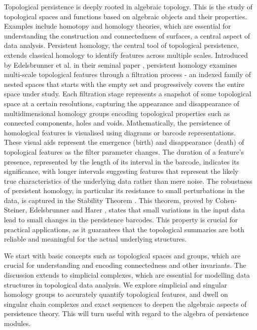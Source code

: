 \label{TopologicalSpaces}
Topological persistence is deeply rooted in algebraic topology. This is the study of topological spaces and functions based on algebraic objects and their properties. Examples include homotopy and homology theories, which are essential for understanding the construction and connectedness of surfaces, a central aspect of data analysis. Persistent homology, the central tool of topological persistence, extends classical homology to identify features across multiple scales. Introduced by Edelsbrunner et al. in their seminal paper \cite{edelsbrunner2000triangulations}, persistent homology examines multi-scale topological features through a filtration process - an indexed family of nested spaces that starts with the empty set and progressively covers the entire space under study. Each filtration stage represents a snapshot of some topological space at a certain resolutions, capturing the appearance and disappearance of multidimensional homology groups encoding topological properties such as connected components, holes and voids. Mathematically, the persistence of homological features is visualised using diagrams or barcode representations.  These visual aids represent the emergence (birth) and disappearance (death) of topological features as the filter parameter changes. The duration of a feature's presence, represented by the length of its interval in the barcode, indicates its significance, with longer intervals suggesting features that represent the likely true characteristics of the underlying data rather than mere noise. The robustness of persistent homology, in particular its resistance to small perturbations in the data, is captured in the Stability Theorem \cite[\S 3.1]{Cohen-Steiner2007}. This theorem, proved by Cohen-Steiner, Edelsbrunner and Harer \cite[\S 3]{bendich2007inferring}, states that small variations in the input data lead to small changes in the persistence barcodes. This property is crucial for practical applications, as it guarantees that the topological summaries are both reliable and meaningful for the actual underlying structures.

We start with basic concepts such as topological spaces and groups, which are crucial for understanding and encoding connectedness and other invariants. The discussion extends to simplicial complexes, which are essential for modelling data structures in topological data analysis.  We explore simplicial and singular homology groups to accurately quantify topological features, and dwell on singular chain complexes and exact sequences to deepen the algebraic aspects of persistence theory. This will turn useful with regard to the algebra of persistence modules.

